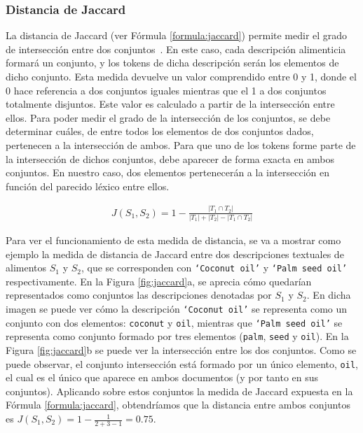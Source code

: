 \subsubsection{Distancia de Jaccard}
La distancia de Jaccard (ver Fórmula \ref{formula:jaccard}) permite medir el grado de intersección entre dos conjuntos~\cite{wang2011fast}. En este caso, cada descripción alimenticia formará un conjunto, y los tokens de dicha descripción serán los elementos de dicho conjunto. Esta medida devuelve un valor comprendido entre 0 y 1, donde el 0 hace referencia a dos conjuntos iguales mientras que el 1 a dos conjuntos totalmente disjuntos. Este valor es calculado a partir de la intersección entre ellos. Para poder medir el grado de la intersección de los conjuntos, se debe determinar cuáles, de entre todos los elementos de dos conjuntos dados, pertenecen a la intersección de ambos. Para que uno de los tokens forme parte de la intersección de dichos conjuntos, debe aparecer de forma exacta en ambos conjuntos. En nuestro caso, dos elementos pertenecerán a la intersección en función del parecido léxico entre ellos.

\begin{align}
\label{formula:jaccard}
    J(S_{1},S_{2})=1-\frac{\left | T_{1} \cap T_{2}\right |}{\left | T_{1} \right |+\left | T_{2} \right |-\left | T_{1}\cap T_{2} \right |} 
\end{align}

Para ver el funcionamiento de esta medida de distancia, se va a mostrar como ejemplo la medida de distancia de Jaccard entre dos descripciones textuales de alimentos $S_1$ y $S_2$, que se corresponden con \texttt{`Coconut oil'} y \texttt{`Palm seed oil'} respectivamente.
En la Figura \ref{fig:jaccard}a, se aprecia cómo quedarían representados como conjuntos las descripciones denotadas por $S_1$ y $S_2$. En dicha imagen se puede ver cómo la descripción \texttt{`Coconut oil'} se representa como un conjunto con dos elementos: \texttt{coconut} y \texttt{oil}, mientras que \texttt{`Palm seed oil'} se representa como conjunto formado por tres elementos (\texttt{palm}, \texttt{seed} y \texttt{oil}). En la Figura \ref{fig:jaccard}b se puede ver la intersección entre los dos conjuntos. Como se puede observar, el conjunto intersección está formado por un único elemento, \texttt{oil}, el cual es el único que aparece en ambos documentos (y por tanto en sus conjuntos). Aplicando sobre estos conjuntos la medida de Jaccard expuesta en la Fórmula \ref{formula:jaccard}, obtendríamos que la distancia entre ambos conjuntos es $J(S_{1},S_{2})=1-\frac{1}{2+3-1} = 0.75$.



